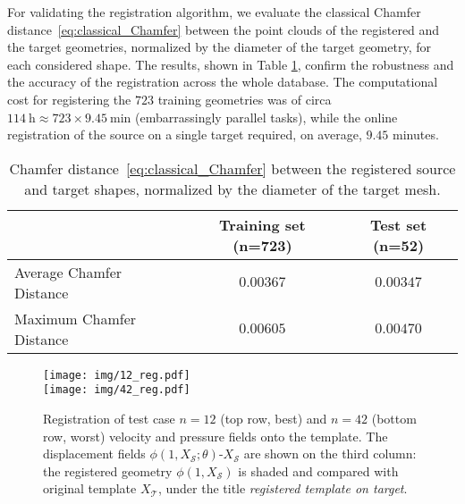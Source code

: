 For validating the registration algorithm, we evaluate the classical Chamfer distance~\eqref{eq:classical_Chamfer} between the point clouds of the 
registered and the target geometries, normalized by the diameter of the target geometry, for each considered shape. The results, shown in Table \ref{tab:reg-chamfer}, confirm the 
robustness and the accuracy of the registration across the whole database.
The computational cost for registering the $723$ training geometries was of circa $\SI{114}{\hour}\approx 723\times\SI{9.45}{\minute}$ (embarrassingly parallel tasks), while the online registration of the source on a single
target required, on average, $9.45$ minutes.
\begin{table}[H]
    \centering
    \begin{tabular}{lcc}
         & \textbf{Training set} (n=723) & \textbf{Test set} (n=52) \\
         \hline
        Average Chamfer Distance & $0.00367$ & $0.00347$ \\
        \hline
        Maximum Chamfer Distance & $0.00605$ & $0.00470$ \\
        \hline
    \end{tabular}
    \caption{Chamfer distance~\eqref{eq:classical_Chamfer} between the registered source and target shapes, normalized by the diameter of the target mesh.}
    \label{tab:reg-chamfer}
\end{table}

%

\begin{figure}[!htp]
  \centering
  \texttt{[image: img/12\_reg.pdf]}\\
  \texttt{[image: img/42\_reg.pdf]}
  \caption{Registration of test case $n=12$ (top row, best) and $n=42$ (bottom row, worst) velocity and pressure fields onto the template. The displacement fields $\phi(1,X_\mathcal{S};\theta)\text{-}X_\mathcal{S}$ are shown on the third column: the registered geometry $\phi(1,X_\mathcal{S})$ is shaded and compared with original template $X_\mathcal{T}$, under the title \textit{registered template on target}.}
  \label{fig:12_42}
\end{figure}


